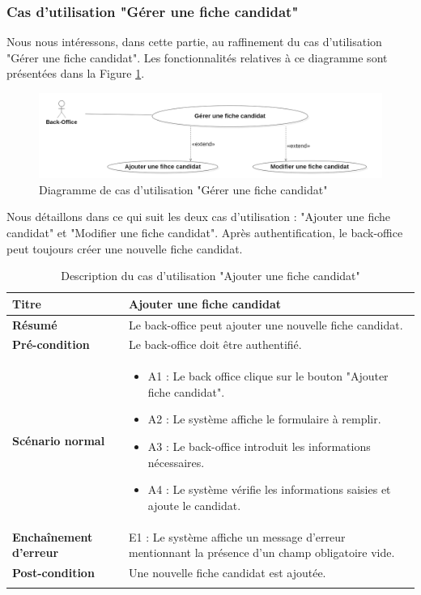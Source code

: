 \subsubsection{Cas d'utilisation "Gérer une fiche candidat"}
Nous nous intéressons, dans cette partie, au raffinement du cas d'utilisation "Gérer une fiche candidat". Les fonctionnalités relatives à ce diagramme sont présentées dans la Figure \ref{fig:raffinement_fiche_candidat}.
\begin{figure}[H]
     \centering
     \includegraphics[scale=0.35]{img/raffinement fiche candidat.png}
     \caption{Diagramme de cas d'utilisation "Gérer une fiche candidat"}
     \label{fig:raffinement_fiche_candidat}
 \end{figure}
Nous détaillons dans ce qui suit les deux cas d'utilisation : "Ajouter une fiche candidat" et "Modifier une fiche candidat". Après authentification, le back-office peut toujours créer une nouvelle fiche candidat.
\begin{longtable}[c]{
    |p{}|
    |p{}|
}
    \hline
    \textbf{Titre}
    &    Ajouter une fiche candidat\\
    \hline
    \textbf{Résumé}
    & Le back-office peut ajouter une nouvelle fiche candidat. \\
    \hline
     \textbf{Pré-condition}
    & Le back-office doit être authentifié.\\
    \hline
     \textbf{Scénario normal}
    & \begin{itemize}
        \item A1 : Le back office clique sur le bouton "Ajouter fiche candidat".
        \item A2 : Le système affiche le formulaire à remplir.
        \item A3 : Le back-office introduit les informations nécessaires.
        \item A4 : Le système vérifie les informations saisies et ajoute le candidat.
    \end{itemize}\\
    \hline
    \textbf{Enchaînement d'erreur}
    & E1 : Le système affiche un message d'erreur mentionnant la présence d'un champ obligatoire vide.\\
    \hline
    \textbf{Post-condition}
    & Une nouvelle fiche candidat est ajoutée.\\
    \hline
\caption{Description du cas d'utilisation "Ajouter une fiche candidat"}
\label{tab:desc_ajout_fiche}
\end{longtable} 
